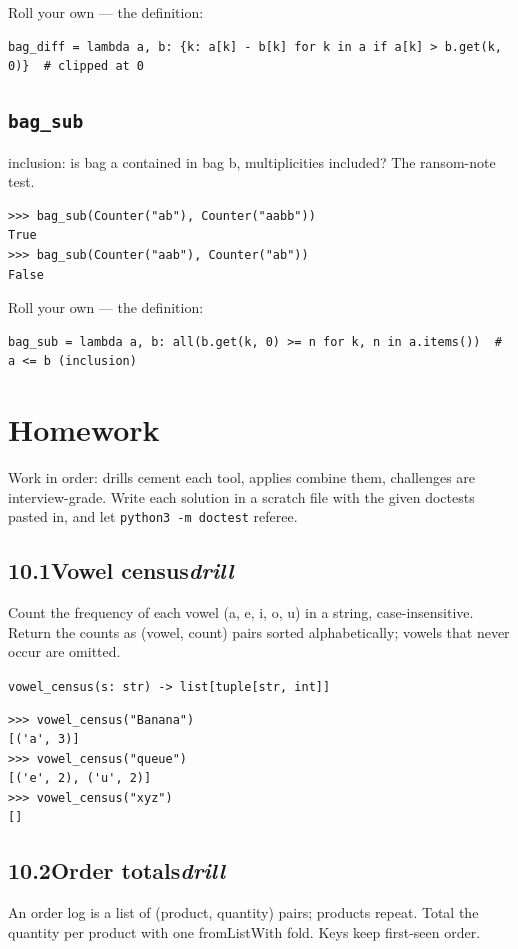 \documentclass[10pt,letterpaper]{book}
\begin{document}
Roll your own --- the definition:

\begin{lstlisting}[style=ex]
bag_diff = lambda a, b: {k: a[k] - b[k] for k in a if a[k] > b.get(k, 0)}  # clipped at 0
\end{lstlisting}
\subsection{\texttt{bag\_sub}}\label{def:bag-sub}
inclusion: is bag a contained in bag b, multiplicities included? The ransom-note test.
\begin{lstlisting}[style=ex]
>>> bag_sub(Counter("ab"), Counter("aabb"))
True
>>> bag_sub(Counter("aab"), Counter("ab"))
False
\end{lstlisting}

Roll your own --- the definition:

\begin{lstlisting}[style=ex]
bag_sub = lambda a, b: all(b.get(k, 0) >= n for k, n in a.items())  # a <= b (inclusion)
\end{lstlisting}
\section{Homework}
Work in order: drills cement each tool, applies combine them,
challenges are interview-grade. Write each solution in a scratch file with
the given doctests pasted in, and let \texttt{python3 -m doctest} referee.
\subsection*{10.1\quad Vowel census\hfill\textnormal{\textit{drill}}}
Count the frequency of each vowel (a, e, i, o, u) in a string, case-insensitive. Return the counts as (vowel, count) pairs sorted alphabetically; vowels that never occur are omitted.

\noindent\texttt{vowel\_census(s: str) -> list[tuple[str, int]]}
\begin{lstlisting}[style=ex]
>>> vowel_census("Banana")
[('a', 3)]
>>> vowel_census("queue")
[('e', 2), ('u', 2)]
>>> vowel_census("xyz")
[]
\end{lstlisting}
\subsection*{10.2\quad Order totals\hfill\textnormal{\textit{drill}}}
An order log is a list of (product, quantity) pairs; products repeat. Total the quantity per product with one fromListWith fold. Keys keep first-seen order.
\end{document}
